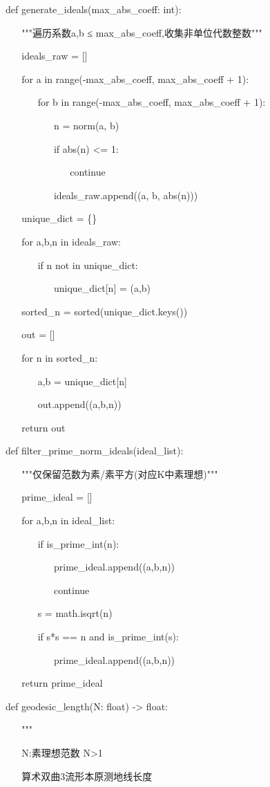 \documentclass[12pt]{article}
\begin{document}
def generate\_ideals(max\_abs\_coeff: int):

~ ~ """遍历系数\textbar a\textbar,\textbar b\textbar{} ≤
max\_abs\_coeff,收集非单位代数整数"""

~ ~ ideals\_raw = {[}{]}

~ ~ for a in range(-max\_abs\_coeff, max\_abs\_coeff + 1):

~ ~ ~ ~ for b in range(-max\_abs\_coeff, max\_abs\_coeff + 1):

~ ~ ~ ~ ~ ~ n = norm(a, b)

~ ~ ~ ~ ~ ~ if abs(n) \textless= 1:

~ ~ ~ ~ ~ ~ ~ ~ continue

~ ~ ~ ~ ~ ~ ideals\_raw.append((a, b, abs(n)))

~ ~ unique\_dict = \{\}

~ ~ for a,b,n in ideals\_raw:

~ ~ ~ ~ if n not in unique\_dict:

~ ~ ~ ~ ~ ~ unique\_dict{[}n{]} = (a,b)

~ ~ sorted\_n = sorted(unique\_dict.keys())

~ ~ out = {[}{]}

~ ~ for n in sorted\_n:

~ ~ ~ ~ a,b = unique\_dict{[}n{]}

~ ~ ~ ~ out.append((a,b,n))

~ ~ return out

def filter\_prime\_norm\_ideals(ideal\_list):

~ ~ """仅保留范数为素/素平方(对应K中素理想)"""

~ ~ prime\_ideal = {[}{]}

~ ~ for a,b,n in ideal\_list:

~ ~ ~ ~ if is\_prime\_int(n):

~ ~ ~ ~ ~ ~ prime\_ideal.append((a,b,n))

~ ~ ~ ~ ~ ~ continue

~ ~ ~ ~ s = math.isqrt(n)

~ ~ ~ ~ if s*s == n and is\_prime\_int(s):

~ ~ ~ ~ ~ ~ prime\_ideal.append((a,b,n))

~ ~ return prime\_ideal

def geodesic\_length(N: float) -\textgreater{} float:

~ ~ """

~ ~ N:素理想范数 N\textgreater1

~ ~ 算术双曲3流形本原测地线长度
\end{document}
